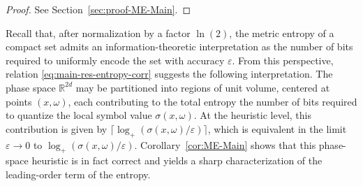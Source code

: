 \documentclass[a4paper,12pt]{article}
\newtheorem{corollary}[theorem]{Corollary}%
\let\originalleft\left
\let\originalright\right
\renewcommand{\left}{\mathopen{}\mathclose\bgroup\originalleft}
\renewcommand{\right}{\aftergroup\egroup\originalright}
\newcommand{\R}{\mathbb{R}}
\newcommand{\diff}{\mathop{}\!d}
\newcommand{\symbolnot}{\sigma}
\begin{document}





\begin{proof}
    See Section~\ref{sec:proof-ME-Main}.
\end{proof}


\noindent
Recall that, after normalization by a factor $\ln(2)$, the metric entropy of a
compact set admits an information-theoretic interpretation as the number of bits
required to uniformly encode the set with accuracy $\varepsilon$.
From this perspective, relation \eqref{eq:main-res-entropy-corr} suggests the
following interpretation.
The phase space $\R^{2d}$ may be partitioned into regions of unit volume, centered
at points $(x,\omega)$, each contributing to the total entropy the number of bits
required to quantize the local symbol value $\sigma(x,\omega)$.
At the heuristic level, this contribution is given by
$\lceil \log_{+}(\sigma(x,\omega)/\varepsilon)\rceil$, which is equivalent in the
limit $\varepsilon\to0$ to $\log_{+}(\sigma(x,\omega)/\varepsilon)$.
Corollary~\ref{cor:ME-Main} shows that this phase-space heuristic is in fact
correct and yields a sharp characterization of the leading-order term of the
entropy.

\end{document}
